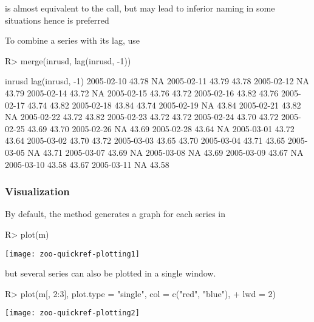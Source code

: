 \documentclass{Z}
\newcommand{\mysection}[1]{\subsubsection[#1]{\textbf{#1}}}
\begin{document}
 is almost equivalent to the 
call, but may lead to inferior naming in some situations 
hence  is preferred

To combine a series with its lag, use
\begin{Schunk}
\begin{Sinput}
R> merge(inrusd, lag(inrusd, -1))
\end{Sinput}
\begin{Soutput}
           inrusd lag(inrusd, -1)
2005-02-10  43.78              NA
2005-02-11  43.79           43.78
2005-02-12     NA           43.79
2005-02-14  43.72              NA
2005-02-15  43.76           43.72
2005-02-16  43.82           43.76
2005-02-17  43.74           43.82
2005-02-18  43.84           43.74
2005-02-19     NA           43.84
2005-02-21  43.82              NA
2005-02-22  43.72           43.82
2005-02-23  43.72           43.72
2005-02-24  43.70           43.72
2005-02-25  43.69           43.70
2005-02-26     NA           43.69
2005-02-28  43.64              NA
2005-03-01  43.72           43.64
2005-03-02  43.70           43.72
2005-03-03  43.65           43.70
2005-03-04  43.71           43.65
2005-03-05     NA           43.71
2005-03-07  43.69              NA
2005-03-08     NA           43.69
2005-03-09  43.67              NA
2005-03-10  43.58           43.67
2005-03-11     NA           43.58
\end{Soutput}
\end{Schunk}

\mysection{Visualization}

By default, the  method generates a graph for each
series in 
\begin{center}
\begin{Schunk}
\begin{Sinput}
R> plot(m)
\end{Sinput}
\end{Schunk}
\texttt{[image: zoo-quickref-plotting1]}
\end{center}

but several series can also be plotted in a single window.
\begin{center}
\begin{Schunk}
\begin{Sinput}
R> plot(m[, 2:3], plot.type = "single", col = c("red", "blue"), 
+     lwd = 2)
\end{Sinput}
\end{Schunk}
\texttt{[image: zoo-quickref-plotting2]}
\end{center}
\end{document}
